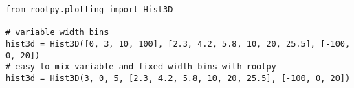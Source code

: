 \begin{footnotesize}
\begin{verbatim}
from rootpy.plotting import Hist3D

# variable width bins
hist3d = Hist3D([0, 3, 10, 100], [2.3, 4.2, 5.8, 10, 20, 25.5], [-100, 0, 20])
# easy to mix variable and fixed width bins with rootpy
hist3d = Hist3D(3, 0, 5, [2.3, 4.2, 5.8, 10, 20, 25.5], [-100, 0, 20])
\end{verbatim}
\end{footnotesize}
